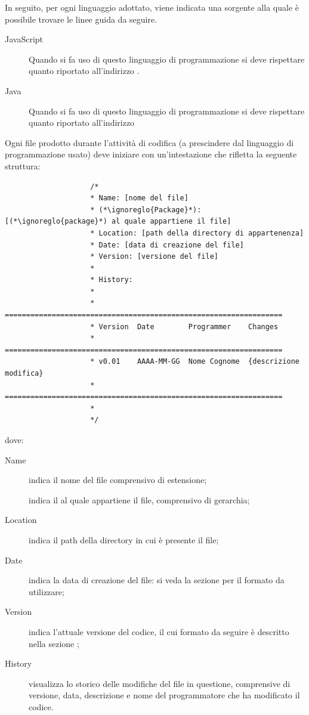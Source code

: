 				In seguito, per ogni linguaggio adottato, viene indicata una sorgente alla quale è possibile trovare le linee guida da seguire.
				\begin{description}
					\item[JavaScript] Quando si fa uso di questo linguaggio di programmazione si deve rispettare quanto riportato all'indirizzo .
					\item[Java] Quando si fa uso di questo linguaggio di programmazione si deve rispettare quanto riportato all'indirizzo 
				\end{description}
			 \label{sec:CodificaIntestazione}
				Ogni file prodotto durante l'attività di codifica (a prescindere dal linguaggio di programmazione usato) deve iniziare con un'intestazione che rifletta la seguente struttura:
				\begin{lstlisting}
					/*
					* Name: [nome del file]
					* (*\ignoreglo{Package}*): [(*\ignoreglo{package}*) al quale appartiene il file]
					* Location: [path della directory di appartenenza]
					* Date: [data di creazione del file]
					* Version: [versione del file]
					* 
					* History:
					* 
					* =================================================================
					* Version  Date        Programmer    Changes
					* =================================================================
					* v0.01    AAAA-MM-GG  Nome Cognome  {descrizione modifica}
					* =================================================================
					*
					*/
				\end{lstlisting}
				dove:
				\begin{description}
					\item[Name] indica il nome del file comprensivo di estensione;
					\item[] indica il  al quale appartiene il file, comprensivo di gerarchia;
					\item[Location] indica il path della directory in cui è presente il file;
					\item[Date] indica la data di creazione del file: si veda la sezione  per il formato da utilizzare;
					\item[Version] indica l'attuale versione del codice, il cui formato da seguire è descritto nella sezione ;
					\item[History] visualizza lo storico delle modifiche del file in questione, comprensive di versione, data, descrizione e nome del programmatore che ha modificato il codice.
				\end{description}
